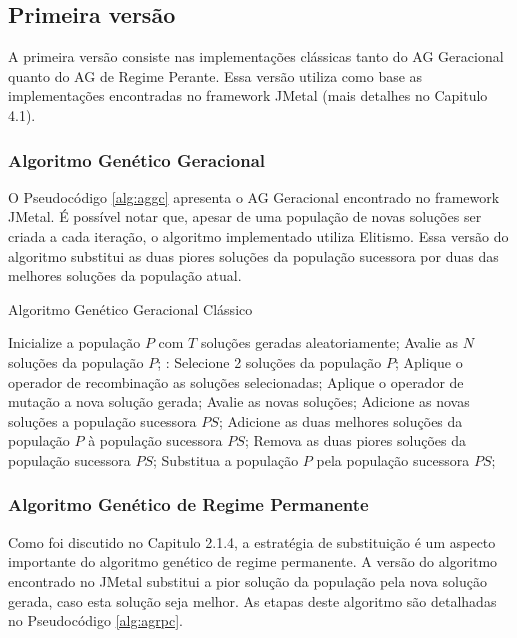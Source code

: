 \subsection{Primeira versão}

A primeira versão consiste nas implementações clássicas tanto do AG Geracional quanto do AG de Regime Perante. Essa versão utiliza como base as implementações encontradas no framework JMetal (mais detalhes no Capitulo 4.1).

\subsubsection{Algoritmo Genético Geracional}

O Pseudocódigo \ref{alg:aggc} apresenta o AG Geracional encontrado no framework JMetal. É possível notar que, apesar de uma população de novas soluções ser criada a cada iteração, o algoritmo implementado utiliza Elitismo. Essa versão do algoritmo substitui as duas piores soluções da população sucessora por duas das melhores soluções da população atual.

\begin{algorithm}
  \caption{Algoritmo Genético Geracional Clássico}
  \label{alg:aggc}
  \begin{algorithmic}
    \State Inicialize a população $P$ com $T$ soluções geradas aleatoriamente;
    \State Avalie as $N$ soluções da população $P$;
       \State:
        \State Selecione 2 soluções da população $P$;
        \State Aplique o operador de recombinação as soluções selecionadas;
        \State Aplique o operador de mutação a nova solução gerada;
        \State Avalie as novas soluções;
        \State Adicione as novas soluções a população sucessora $PS$;
      \EndFor
      \State Adicione as duas melhores soluções da população $P$ à população sucessora $PS$;
      \State Remova as duas piores soluções da população sucessora $PS$;
      \State Substitua a população $P$ pela população sucessora $PS$;
    \EndWhile
  \end{algorithmic}
\end{algorithm}

\subsubsection{Algoritmo Genético de Regime Permanente}

Como foi discutido no Capitulo 2.1.4, a estratégia de substituição é um aspecto importante do algoritmo genético de regime permanente. A versão do algoritmo encontrado no JMetal substitui a pior solução da população pela nova solução gerada, caso esta solução seja melhor. As etapas deste algoritmo são detalhadas no Pseudocódigo \ref{alg:agrpc}.

